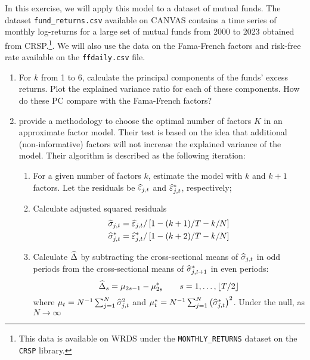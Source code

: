 In this exercise, we will apply this model to a dataset of mutual funds. The dataset \texttt{fund\_returns.csv} available on CANVAS contains a time series of monthly log-returns for a large set of mutual funds from 2000 to 2023 obtained from CRSP.\footnote{This data is available on WRDS under the \texttt{MONTHLY\_RETURNS} dataset on the \texttt{CRSP} library.}. We will also use the data on the Fama-French factors and risk-free rate available on the \texttt{ffdaily.csv} file.

\begin{enumerate}[label = \Alph*)]
    \item For \(k\) from 1 to 6, calculate the principal components of the funds' excess returns. Plot the explained variance ratio for each of these components. How do these PC compare with the Fama-French factors?
    \item \citet{connor1993test} provide a methodology to choose the optimal number of factors \(K\) in an approximate factor model. Their test is based on the idea that additional (non-informative) factors will not increase the explained variance of the model. Their algorithm is described as the following iteration:
    \begin{enumerate}[label = \arabic*), leftmargin = *]
        \item For a given number of factors \(k\), estimate the model with \(k\) and \(k+1\) factors. Let the residuals be \(\widehat{\varepsilon}_{j,t}\) and \(\widehat{\varepsilon}^\ast_{j,t}\), respectively;
        \item Calculate adjusted squared residuals
        \begin{equation}
            \begin{aligned}
                \widehat{\sigma}_{j,t} & = \widehat{\varepsilon}_{j,t}/\left[ 1-(k+1)/T-k/N \right] \\
                \widehat{\sigma}_{j,t}^\ast & = \widehat{\varepsilon}_{j,t}^\ast/\left[ 1-(k+2)/T-k/N \right]
            \end{aligned}
        \end{equation}
        \item Calculate \(\widehat{\Delta}\) by subtracting the cross-sectional means of \(\widehat{\sigma}_{j,t}\) in odd periods from the cross-sectional means of \(\widehat{\sigma}_{j, t+1}^\ast\) in even periods:
        \begin{equation}
            \widehat{\Delta}_s = \mu_{2s-1} - \mu_{2s}^\ast \qquad s = 1, \dots, \left\lfloor T/2 \right\rfloor
        \end{equation}
        where \(\mu_t = N^{-1}\sum_{j=1}^N\widehat{\sigma}_{j,t}^2\) and \(\mu_t^\ast = N^{-1}\sum_{j=1}^N\left( \widehat{\sigma}_{j,t}^\ast \right)^2\). Under the null, as \(N \to \infty\)

\end{enumerate}
\end{enumerate}
